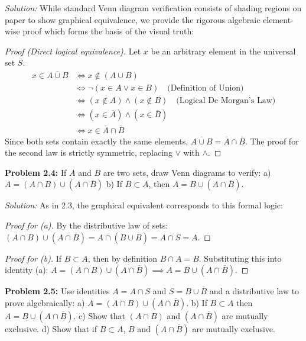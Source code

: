\documentclass[11pt]{article}
\newcommand{\prob}[1]{\vspace{4mm}\noindent\textbf{Problem #1:}}
\newcommand{\sol}{\vspace{2mm}\noindent\textit{Solution: }}
\begin{document}
\sol 
While standard Venn diagram verification consists of shading regions on paper to show graphical equivalence, we provide the rigorous algebraic element-wise proof which forms the basis of the visual truth:
\begin{proof}[Proof (Direct logical equivalence)]
Let $x$ be an arbitrary element in the universal set $S$.
\begin{align*}
    x \in \overline{A \cup B} &\iff x \notin (A \cup B) \\
    &\iff \neg(x \in A \lor x \in B) \quad \text{(Definition of Union)} \\
    &\iff (x \notin A) \land (x \notin B) \quad \text{(Logical De Morgan's Law)} \\
    &\iff (x \in \overline{A}) \land (x \in \overline{B}) \\
    &\iff x \in \overline{A} \cap \overline{B}
\end{align*}
Since both sets contain exactly the same elements, $\overline{A \cup B} = \overline{A} \cap \overline{B}$. The proof for the second law is strictly symmetric, replacing $\lor$ with $\land$.
\end{proof}

\prob{2.4}
If $A$ and $B$ are two sets, draw Venn diagrams to verify:
a) $A = (A \cap B) \cup (A \cap \overline{B})$
b) If $B \subset A$, then $A = B \cup (A \cap \overline{B})$.

\sol
As in 2.3, the graphical equivalent corresponds to this formal logic:
\begin{proof}[Proof for (a)]
By the distributive law of sets:
$ (A \cap B) \cup (A \cap \overline{B}) = A \cap (B \cup \overline{B}) = A \cap S = A $.
\end{proof}
\begin{proof}[Proof for (b)]
If $B \subset A$, then by definition $B \cap A = B$. Substituting this into identity (a):
$A = (A \cap B) \cup (A \cap \overline{B}) \implies A = B \cup (A \cap \overline{B})$.
\end{proof}

\prob{2.5}
Use identities $A = A \cap S$ and $S = B \cup \overline{B}$ and a distributive law to prove algebraically:
a) $A = (A \cap B) \cup (A \cap \overline{B})$.
b) If $B \subset A$ then $A = B \cup (A \cap \overline{B})$.
c) Show that $(A \cap B)$ and $(A \cap \overline{B})$ are mutually exclusive.
d) Show that if $B \subset A$, $B$ and $(A \cap \overline{B})$ are mutually exclusive.
\end{document}
